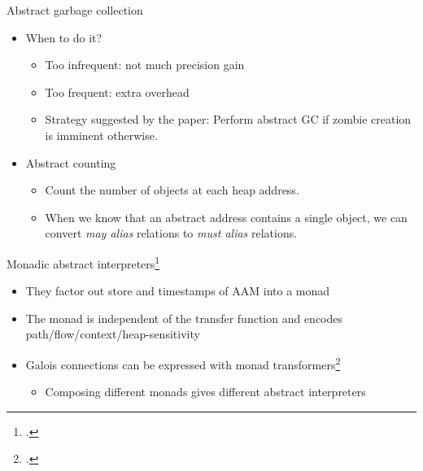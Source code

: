 \documentclass[aspectratio=169]{beamer}
\begin{document}

\begin{frame}{Abstract garbage collection}
  \begin{itemize}[<+->]
  \item When to do it?
    \begin{itemize}
    \item Too infrequent: not much precision gain
    \item Too frequent: extra overhead\pause
    \item Strategy suggested by the paper: Perform abstract GC if zombie creation is imminent otherwise.
    \end{itemize}
  \item Abstract counting
    \begin{itemize}
    \item Count the number of objects at each heap address.
    \item When we know that an abstract address contains a single object, we can convert \emph{may alias} relations to \emph{must alias} relations.
    \end{itemize}
  \end{itemize}
\end{frame}

\begin{frame}{Monadic abstract interpreters\footcite{sergey2013monadic}}
  \begin{itemize}
  \item They factor out store and timestamps of AAM into a monad
  \item The monad is independent of the transfer function and encodes path/flow/context/heap-sensitivity
  \item Galois connections can be expressed with monad transformers\footcite{darais2015galois}
    \begin{itemize}
    \item  Composing different monads gives different abstract interpreters
    \end{itemize}
  \end{itemize}
\end{frame}
\end{document}

